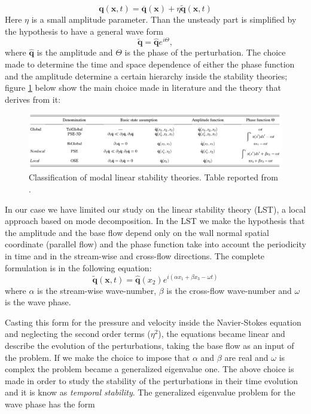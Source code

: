$$ \mathbf{q} (\mathbf{x},t)= \overline{\mathbf{q}} (\mathbf{x}) + \eta \widetilde{\mathbf{q}} (\mathbf{x},t) $$
Here $\eta$ is a small amplitude parameter.
Than the unsteady part is simplified by the hypothesis to have a general wave form
$$  \widetilde{\mathbf{q}} =  \widehat{\mathbf{q}} e^{i\Theta}, $$
where $\widehat{\mathbf{q}}$ is the amplitude and $\Theta$ is the phase of the perturbation.
The choice made to determine the time and space dependence of either the phase function and the amplitude determine a certain hierarchy inside the stability theories; figure \ref{fig:table} below show the main choice made in literature and the theory that derives from it:

\begin{figure}[h]
	\centering
	\includegraphics[width=1\linewidth]{chapter_1/table}
	\caption{Classification of modal linear stability theories. Table reported from \citet{juniper2014modal}.}
	\label{fig:table}
\end{figure}
 
In our case we have limited our study on the linear stability theory (LST), a local approach based on mode decomposition.
In the LST we make the hypothesis that the amplitude and the base flow depend only on the wall normal spatial coordinate (parallel flow) and the phase function take into account the periodicity in time and in the stream-wise and cross-flow directions.
The complete formulation is in the following equation:
 $$  \widetilde{\mathbf{q}}(\mathbf{x},t) =  \widehat{\mathbf{q}}(x_2) e^{i(\alpha x_1 + \beta x_3 - \omega t)}  $$ 
where $\alpha$ is the stream-wise wave-number, $\beta$ is the cross-flow wave-number and $\omega$ is the wave phase.

Casting this form for the pressure and velocity inside the Navier-Stokes equation and neglecting the second order terms ($\eta^2$), the equations became linear and  describe the evolution of the perturbations, taking the base flow as an input of the problem.
If we make the choice to impose that $\alpha$ and $\beta$ are real and $\omega$ is complex the problem became a generalized eigenvalue one.
The above choice is made in order to study the stability of the perturbations in their time evolution and it is know as \textit{temporal stability}.
The generalized eigenvalue problem for the wave phase has the form

